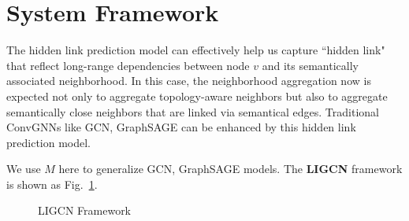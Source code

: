 \vspace{-1ex}
\section{System Framework}
\label{sec-framework}

The hidden link prediction model can effectively help us capture ``hidden link" that reflect long-range dependencies between node $v$ and its semantically associated neighborhood. In this case, the neighborhood aggregation now is expected not only to aggregate topology-aware neighbors but also to aggregate semantically close neighbors that are linked via semantical edges. Traditional ConvGNNs like GCN, GraphSAGE can be enhanced by this hidden link prediction model.

We use $M$ here to generalize GCN, GraphSAGE models. The \textbf{LIGCN} framework is shown as Fig.~\ref{fig:hllM}.

\begin{figure}[tb!]
\begin{center}
{\small
\begin{minipage}{3.36in}
\myhrule
\vspace{-1ex}
\vspace{-3ex}
\myhrule
\end{minipage}
}
\end{center}
\vspace{-2ex}
\caption{LIGCN Framework} 
\label{fig:hllM}
\vspace{-3ex}
\end{figure}


\vspace{.5ex}





